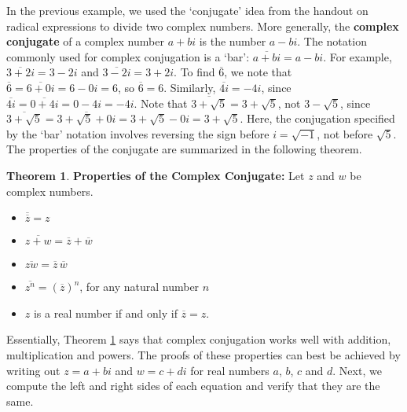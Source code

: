 \documentclass[11pt]{article}
\theoremstyle{definition}  %
\newtheorem{thm}{\bf Theorem}
\newcommand{\bbm}{\begin{boxedminipage}{6.41in}}
\newcommand{\ebm}{\end{boxedminipage}}
\begin{document}
In the previous example, we used the `conjugate' idea from the handout on radical expressions to divide two complex numbers.  More generally, the \textbf{complex conjugate} of a complex number $a+bi$ is the number $a-bi$.  The notation commonly used for complex conjugation is a `bar':  $\overline{a+bi} = a-bi$. For example, $\overline{3+2i} = 3-2i$ and $\overline{3-2i} = 3+2i$. To find $\overline{6}$, we note that $\overline{6} = \overline{6+0i}= 6 - 0i = 6$, so $\overline{6} = 6$. Similarly, $\overline{4i} = -4i$, since $\overline{4i} = \overline{0 + 4i} = 0 - 4i =  -4i$.  Note that $\overline{3+\sqrt{5}} = 3 + \sqrt{5}$, not $3 - \sqrt{5}$, since  $\overline{3+\sqrt{5}} = \overline{3+\sqrt{5} + 0i} = 3+\sqrt{5}  - 0i = 3+\sqrt{5}$. Here, the conjugation specified by the `bar' notation involves reversing the sign before $i = \sqrt{-1}$, not before  $\sqrt{5}$.  The properties of the conjugate are summarized in the following theorem.

\medskip

\colorbox{ResultColor}{\bbm

\begin{thm}  \label{conjugateprops}{\bf Properties of the Complex Conjugate:} Let $z$ and $w$ be complex numbers. 

\begin{itemize}

\item  $\overline{\overline{z}} = z$

\item  $ \overline{z+w} = \overline{z} + \overline{w}$

\item  $ \overline{zw} = \overline{z} \, \overline{w}$

\item  $\overline{z^{n}} = \left(\overline{z}\right)^n$, for any natural number $n$

\item  $z$ is a real number if and only if $\overline{z} = z$.

\end{itemize}

\end{thm}
\ebm}

\medskip

Essentially, Theorem \ref{conjugateprops} says that complex conjugation works well with addition, multiplication and powers.  The proofs of these properties can best be achieved by writing out $z = a+bi$ and $w = c+di$ for real numbers $a$, $b$, $c$ and $d$.   Next, we compute the left and right sides of each equation and verify that they are the same.  
\end{document}
